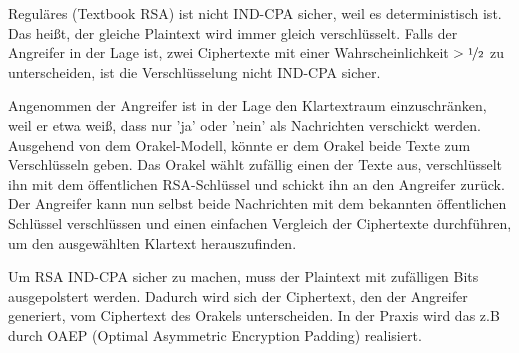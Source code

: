 Reguläres (Textbook RSA) ist nicht IND-CPA sicher, weil es deterministisch ist.
Das heißt, der gleiche Plaintext wird immer gleich verschlüsselt. Falls der Angreifer
in der Lage ist, zwei Ciphertexte mit einer Wahrscheinlichkeit $> \nicefrac{1}{2}$ zu unterscheiden,
ist die Verschlüsselung nicht IND-CPA sicher. 

Angenommen der Angreifer ist in der Lage den Klartextraum einzuschränken, weil er 
etwa weiß, dass nur 'ja' oder 'nein' als Nachrichten verschickt werden. Ausgehend von dem Orakel-Modell,
könnte er dem Orakel beide Texte zum Verschlüsseln geben. Das Orakel wählt zufällig
einen der Texte aus, verschlüsselt ihn mit dem öffentlichen RSA-Schlüssel und schickt ihn
an den Angreifer zurück. Der Angreifer kann nun selbst beide Nachrichten mit dem bekannten
öffentlichen Schlüssel verschlüssen und einen einfachen Vergleich der Ciphertexte durchführen,
um den ausgewählten Klartext herauszufinden.

Um RSA IND-CPA sicher zu machen, muss der Plaintext mit zufälligen Bits ausgepolstert werden. Dadurch
wird sich der Ciphertext, den der Angreifer generiert, vom Ciphertext des Orakels unterscheiden.
In der Praxis wird das z.B durch OAEP (Optimal Asymmetric Encryption Padding) realisiert.